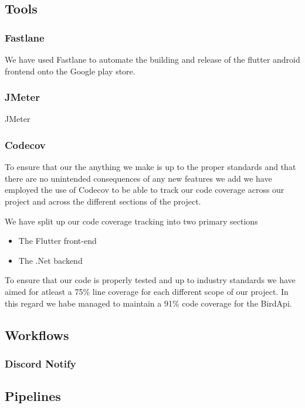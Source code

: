 \documentclass[a4paper]{article}
\begin{document}
\subsection{Tools}

\subsubsection{Fastlane}
We have used Fastlane to automate the building and release of the flutter android frontend onto the 
Google play store.

\subsubsection{JMeter}
JMeter

\subsubsection{Codecov}
To ensure that our the anything we make is up to the proper standards and that 
there are no unintended consequences of any new features we add we have employed
the use of Codecov to be able to track our code coverage across our project and 
across the different sections of the project.\newline

We have split up our code coverage tracking into two primary sections

\begin{itemize}
    \item The Flutter front-end
    \item The .Net backend
\end{itemize}

To ensure that our code is properly tested and up to industry standards we have
aimed for atleast a 75\%  line coverage for each different scope of our project.
\newline
In this regard we habe managed to maintain a 91\% code coverage for the BirdApi.

\subsection{Workflows}

\subsubsection{Discord Notify}



\subsection{Pipelines}
\end{document}
